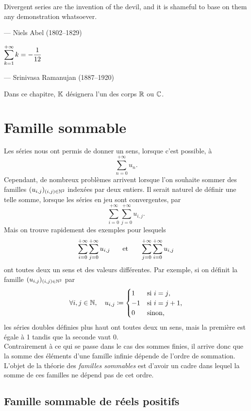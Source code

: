 \documentclass{magnolia}
\begin{document}
\setlength{}
\epigraph{\og Divergent series are the invention of the devil, and it is shameful to base on them any demonstration whatsoever. \fg}{--- {\sc Niels Abel (1802--1829)}}

\setlength{}
\epigraph{$\displaystyle \sum_{k=1}^{+\infty} k=-\frac{1}{12}$}{--- {\sc Srinivasa Ramanujan (1887--1920)}}

\magtoc
\vspace{2ex}
Dans ce chapitre, $\mathbb{K}$ désignera l'un des corps $\mathbb{R}$ ou $\mathbb{C}$.

\section{Famille sommable}


Les séries nous ont permis de donner un sens, lorsque c'est possible, à
\[\sum_{n=0}^{+\infty} u_n.\]
Cependant, de nombreux problèmes arrivent lorsque l'on souhaite sommer des familles $(u_{i,j})_{(i,j)\in\mathbb{N}^2}$
indexées par deux entiers. Il serait naturel de définir une telle somme, lorsque les séries en jeu
sont convergentes, par
\[\sum_{i=0}^{+\infty} \sum_{j=0}^{+\infty} u_{i,j}.\]
Mais on trouve rapidement des exemples pour lesquels
\[\sum_{i=0}^{+\infty} \sum_{j=0}^{+\infty} u_{i,j} \quad\quad\!\text{et}\quad\!\quad
  \sum_{j=0}^{+\infty} \sum_{i=0}^{+\infty} u_{i,j}\]
ont toutes deux un sens et des valeurs différentes. Par exemple, si on définit la famille $(u_{i,j})_{(i,j)\in\mathbb{N}^2}$
par
\[\forall i,j\in\mathbb{N},\quad u_{i,j}\coloneqq\begin{cases}
  1 & \text{si $i=j$,}\\
  -1 & \text{si $i=j+1$,}\\
  0 & \text{sinon,}\end{cases}\]
les séries doubles définies plus haut ont toutes deux un sens, mais la première est égale à 1 tandis que la seconde
vaut 0.\\

Contrairement à ce qui se passe dans le cas des sommes finies, il arrive donc que la \og somme \fg des éléments
d'une famille infinie dépende de l'ordre de sommation. L'objet de la théorie des \emph{familles sommables} est d'avoir
un cadre dans lequel la somme de ces familles ne dépend pas de cet ordre.


\subsection{Famille sommable de réels positifs}
\end{document}
